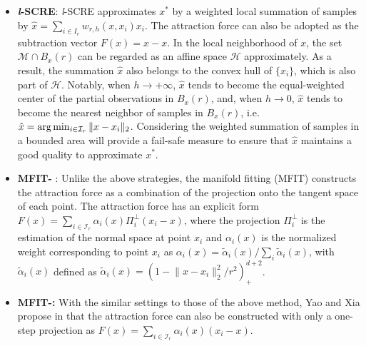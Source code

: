 \documentclass[aos,preprint]{imsart}
\theoremstyle{remark}
\begin{document}
\begin{appendix}
\begin{itemize}
\item{\bf {\it l}-SCRE}:  {\it l}-SCRE approximates ${x}^*$ by a weighted local summation of samples by $\hat{x} = \sum_{i\in I_r} w_{r,h} ({x}, x_i)x_i$. The attraction force can also be adopted as the subtraction vector $F(x) = \hat{x}-x$. In the local neighborhood of ${x}$, the set ${\mathcal M} \cap  B_{{x}}(r)$ can be regarded as an affine space $\mathcal H$ approximately. As a result, the summation $\hat{x}$ also belongs to the convex hull of $\{x_i\}$, which is also part of $\mathcal H$. Notably, when $h\rightarrow +\infty$, $\hat{x}$ tends to become the equal-weighted center of the partial observations in $B_{{x}}(r)$, and, when $h\rightarrow 0$, $\hat{x}$ tends to become the nearest neighbor of samples in $B_{{x}}(r)$, i.e. $\hat{x} = \arg\min_{i \in {\cal I}_r} \|{x}-x_i\|_2$. Considering the weighted summation of samples in a bounded area will provide a fail-safe measure to ensure that $\hat{x}$ maintains a good quality to approximate ${x}^*$.
\item{\bf MFIT-} :  Unlike the above strategies, the manifold fitting (MFIT) \cite{fefferman2018fitting} constructs the attraction force as a combination of the projection onto the tangent space of each point. The attraction force has an explicit form $F(x)= \sum_{i\in{\mathcal I}_r}\alpha_i(x) \Pi_i^\perp (x_i - x)$, where the projection $\Pi_i^\perp$ is the estimation of the normal space at point $x_i$ and $\alpha_i(x)$ is the normalized weight corresponding to point $x_i$ as $\alpha_i(x) = \tilde{\alpha}_i(x)/ \sum_i \tilde{\alpha}_i(x)$, with $\tilde{\alpha}_i(x)$ defined as $\tilde{\alpha}_i(x) = (1-{\|x-x_i\|_2^2}/{r^2})^{d+2}_+$.
\item{\bf MFIT-:} With the similar settings to those of the above method, Yao and Xia propose in \cite{yao2019manifold} that the attraction force can also be constructed with only a one-step projection as $F(x)= \sum_{i\in{\mathcal I}_r}\alpha_i(x)  (x_i - x)$.
\end{itemize}

\end{appendix}
\end{document}
